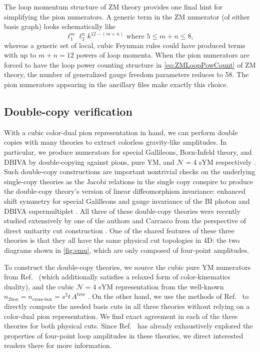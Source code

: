 \documentclass[11pt,letter]{article}
\newcommand{\atree}{\ensuremath{A^{\text{tree}}}}
\begin{document}
The loop momentum structure of ZM theory provides one final hint for
simplifying the pion numerators.  A generic term in the ZM numerator
(of either basis graph) looks schematically like
\begin{equation}
\label{eq:ZMLoopPowCount}
\ell_1^m \ell_2^n k^{12-(m+n)} \text{ where } 5 \leq m+n \leq 8,
\end{equation}
whereas a generic set of local, cubic Feynman rules could have
produced terms with up to $m+n=12$ powers of loop momenta.  When the
pion numerators are forced to have the loop power counting structure in
\cref{eq:ZMLoopPowCount} of ZM theory, the number of generalized gauge
freedom parameters reduces to 58.  The pion numerators appearing in the
ancillary files make exactly this choice.

\subsection{Double-copy verification}
\label{doubleCopyVerify}

With a cubic color-dual pion representation in hand, we can perform
double copies with many theories to extract colorless gravity-like
amplitudes.  In particular, we produce numerators for special
Gallileons, Born-Infeld theory, and DBIVA by double-copying against
pions, pure YM, and $\mathcal{N}=4$ sYM respectively
\cite{Cachazo:2014xea,Cheung:2015ota,Cheung:2016drk}.  Such double-copy constructions are important nontrivial
checks on the underlying single-copy theories as the Jacobi relations
in the single copy conspire to produce the double-copy theory's
version of linear diffeomorphism invariance: enhanced shift symmetry for special Galilleons and gauge
invariance of the BI photon and DBIVA supermultiplet \cite{Hinterbichler:2015pqa}.  All
three of these double-copy theories were recently studied extensively
by one of the authors and Carrasco from the perspective of direct
unitarity cut construction \cite{Carrasco:2023qgz}.  One of the shared
features of these three theories is that they all have the same
physical cut topologies in 4D: the two diagrams shown in
\cref{fig:emu}, which are only composed of four-point amplitudes.

To construct the double-copy theories, we source the cubic
pure YM numerators from Ref.~\cite{Bern:2015ooa} (which
additionally satisfies a relaxed form of color-kinematics duality),
and the cubic $\mathcal{N}=4$ sYM representation from the well-known
$n_{2\text{box}} = n_{\text{cross-box}} = s^2t\, \atree$ \cite{Bern:1997nh}.
On the other hand, we use the methods of Ref.~\cite{Carrasco:2023qgz}
to directly compute the needed basis cuts in all three theories without
relying on a color-dual pion representation.  We find exact agreement
in each of the three theories for both physical cuts.  Since
Ref.~\cite{Carrasco:2023qgz} has already exhaustively explored the
properties of four-point loop amplitudes in these theories, we direct
interested readers there for more information.
\end{document}
